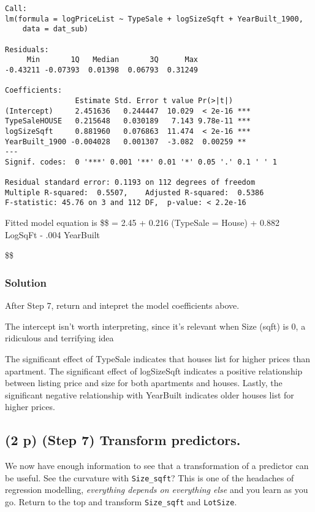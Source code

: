 \documentclass[
  12pt,
]{article}
\begin{document}
\begin{verbatim}
Call:
lm(formula = logPriceList ~ TypeSale + logSizeSqft + YearBuilt_1900, 
    data = dat_sub)

Residuals:
     Min       1Q   Median       3Q      Max 
-0.43211 -0.07393  0.01398  0.06793  0.31249 

Coefficients:
                Estimate Std. Error t value Pr(>|t|)    
(Intercept)     2.451636   0.244447  10.029  < 2e-16 ***
TypeSaleHOUSE   0.215648   0.030189   7.143 9.78e-11 ***
logSizeSqft     0.881960   0.076863  11.474  < 2e-16 ***
YearBuilt_1900 -0.004028   0.001307  -3.082  0.00259 ** 
---
Signif. codes:  0 '***' 0.001 '**' 0.01 '*' 0.05 '.' 0.1 ' ' 1

Residual standard error: 0.1193 on 112 degrees of freedom
Multiple R-squared:  0.5507,    Adjusted R-squared:  0.5386 
F-statistic: 45.76 on 3 and 112 DF,  p-value: < 2.2e-16
\end{verbatim}

Fitted model equation is \$\$  = 2.45
+ 0.216 \times {}(TypeSale = House) + 0.882 \times LogSqFt - .004
\times YearBuilt

\$\$

\hypertarget{solution-4}{%
\subsubsection{Solution}\label{solution-4}}

After Step 7, return and intepret the model coefficients above.

The intercept isn't worth interpreting, since it's relevant when Size
(sqft) is 0, a ridiculous and terrifying idea

The significant effect of TypeSale indicates that houses list for higher
prices than apartment. The significant effect of logSizeSqft indicates a
positive relationship between listing price and size for both apartments
and houses. Lastly, the significant negative relationship with YearBuilt
indicates older houses list for higher prices.

\hypertarget{p-step-7-transform-predictors.}{%
\subsection{\texorpdfstring{\textbf{(2 p)} (Step 7) Transform
predictors.}{(2 p) (Step 7) Transform predictors.}}\label{p-step-7-transform-predictors.}}

We now have enough information to see that a transformation of a
predictor can be useful. See the curvature with \texttt{Size\_sqft}?
This is one of the headaches of regression modelling, \emph{everything
depends on everything else} and you learn as you go. Return to the top
and transform \texttt{Size\_sqft} and \texttt{LotSize}.
\end{document}
